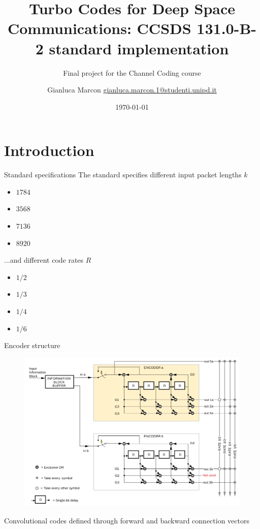 \documentclass[handout,xcolor={usenames,dvipsnames},11pt]{beamer}
\title{ \Large Turbo Codes for Deep Space Communications: CCSDS 131.0-B-2 standard implementation}
\subtitle{Final project for the Channel Coding course}
\author[G. Marcon]{Gianluca Marcon \hfill \href{mailto:gianluca.marcon.1@studenti.unipd.it}{gianluca.marcon.1@studenti.unipd.it}}
\date{\today}
\institute{University of Padova}
\begin{document}
\maketitle

\section{Introduction}
\begin{frame}{Standard specifications}
    The standard specifies different input packet lengths $k$
    \begin{itemize}
        \item $1784$
        \item $3568$
        \item $7136$
        \item $8920$
    \end{itemize}\pause

    ...and different code rates $R$
    \begin{itemize}
        \item $1/2$
        \item $1/3$
        \item $1/4$
        \item $1/6$
    \end{itemize}    
\end{frame}
\begin{frame}{Encoder structure}
    \begin{figure}
        \centering
        \includegraphics[height=0.75\textheight]{./images/encoder-structure}
    \end{figure}
    Convolutional codes defined through forward and backward connection vectors
\end{frame}
\end{document}
